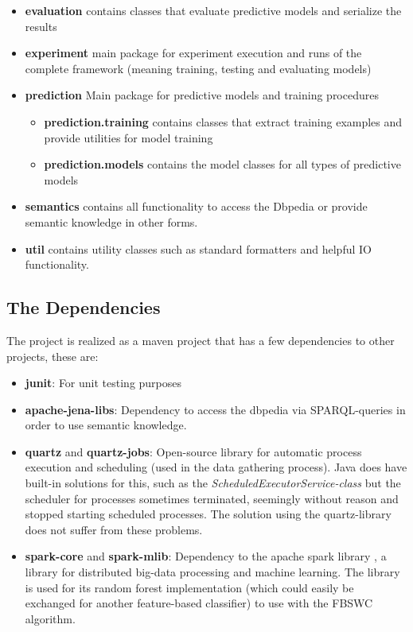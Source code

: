 \begin{itemize}
\begin{itemize}
		\item \textbf{episode.unstable\textunderscore experimental\textunderscore lossy\textunderscore counting} Package that contains experimental, less sophisticated classes to experiment with episode mining using the lossy counting algorithm. The contents of this package were not used to generate any final results as presented in chapter \ref{chapter_evaluation}.
	\end{itemize}
	\item \textbf{evaluation} contains classes that evaluate predictive models and serialize the results
	\item \textbf{experiment} main package for experiment execution and runs of the complete framework (meaning training, testing and evaluating models)
	\item \textbf{prediction} Main package for predictive models and training procedures
	\begin{itemize}
		\item \textbf{prediction.training} contains classes that extract training examples and provide utilities for model training
		\item \textbf{prediction.models} contains the model classes for all types of predictive models
	\end{itemize}		
	\item \textbf{semantics} contains all functionality to access the Dbpedia \cite{auer2007dbpedia} or provide semantic knowledge in other forms.
	\item \textbf{util} contains utility classes such as standard formatters and helpful IO functionality.
\end{itemize}

\subsection{The Dependencies}
The project is realized as a maven project that has a few dependencies to other projects, these are:

\begin{itemize}
	\item \textbf{junit}: For unit testing purposes
	\item \textbf{apache-jena-libs}: Dependency to access the dbpedia via SPARQL-queries in order to use semantic knowledge.
	\item \textbf{quartz} and \textbf{quartz-jobs}: Open-source library for automatic process execution and scheduling (used in the data gathering process). Java does have built-in solutions for this, such as the \textit{ScheduledExecutorService-class} but the scheduler for processes sometimes terminated, seemingly without reason and stopped starting scheduled processes. The solution using the quartz-library does not suffer from these problems.
	\item \textbf{spark-core} and \textbf{spark-mlib}: Dependency to the apache spark library \cite{meng2016mllib}, a library for distributed big-data processing and machine learning. The library is used for its random forest implementation (which could easily be exchanged for another feature-based classifier) to use with the FBSWC algorithm.
\end{itemize}

